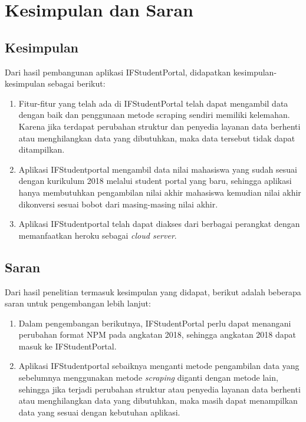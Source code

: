 \chapter{Kesimpulan dan Saran}
\label{chap:kesimpulan_saran}

\section{Kesimpulan}
\label{sec:kesimpulan}
Dari hasil pembangunan aplikasi IFStudentPortal, didapatkan kesimpulan-kesimpulan sebagai berikut:
\begin{enumerate}
	\item Fitur-fitur yang telah ada di IFStudentPortal telah dapat mengambil data dengan baik dan penggunaan metode scraping sendiri memiliki kelemahan. Karena jika terdapat perubahan struktur dan penyedia layanan data berhenti atau menghilangkan data yang dibutuhkan, maka data tersebut tidak dapat ditampilkan.
	\item Aplikasi IFStudentportal mengambil data nilai mahasiswa yang sudah sesuai dengan kurikulum 2018 melalui student portal yang baru, sehingga aplikasi hanya membutuhkan pengambilan nilai akhir mahasiswa kemudian nilai akhir dikonversi sesuai bobot dari masing-masing nilai akhir.
	\item Aplikasi IFStudentportal telah dapat diakses dari berbagai perangkat dengan memanfaatkan heroku sebagai \textit{cloud server}.
\end{enumerate}

\section{Saran}
\label{sec:saran}
Dari hasil penelitian termasuk kesimpulan yang didapat, berikut adalah beberapa saran untuk pengembangan lebih lanjut:
\begin{enumerate}
	\item Dalam pengembangan berikutnya, IFStudentPortal perlu dapat menangani perubahan format NPM pada angkatan 2018, sehingga angkatan 2018 dapat masuk ke IFStudentPortal.
	\item Aplikasi IFStudentportal sebaiknya menganti metode pengambilan data  yang sebelumnya menggunakan metode \textit{scraping} diganti dengan metode lain, sehingga jika terjadi perubahan struktur atau penyedia layanan data berhenti atau menghilangkan data yang dibutuhkan, maka masih dapat menampilkan data yang sesuai dengan kebutuhan aplikasi.
\end{enumerate}